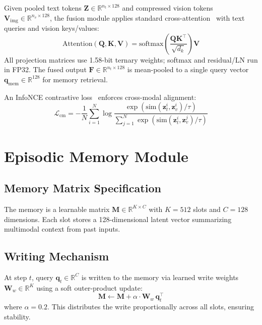 Given pooled text tokens $\mathbf{Z} \in \mathbb{R}^{n_t \times 128}$ and compressed vision tokens $\mathbf{V}_{\text{img}} \in \mathbb{R}^{n_v \times 128}$, the fusion module applies standard cross-attention~\cite{vaswani2017attention} with text queries and vision keys/values:
\begin{equation}
    \mathrm{Attention}(\mathbf{Q}, \mathbf{K}, \mathbf{V}) = \mathrm{softmax}\!\left(\frac{\mathbf{Q}\mathbf{K}^\top}{\sqrt{d_k}}\right)\mathbf{V}
\end{equation}
All projection matrices use 1.58-bit ternary weights; softmax and residual/LN run in FP32. The fused output $\mathbf{F} \in \mathbb{R}^{n_t \times 128}$ is mean-pooled to a single query vector $\mathbf{q}_{\text{mem}} \in \mathbb{R}^{128}$ for memory retrieval.

An InfoNCE contrastive loss~\cite{oord2018representation} enforces cross-modal alignment:
\begin{equation}
    \mathcal{L}_{\text{cm}} = -\frac{1}{N}\sum_{i=1}^{N} \log \frac{\exp(\mathrm{sim}(\mathbf{z}_t^i, \mathbf{z}_v^i)/\tau)}{\sum_{j=1}^{N} \exp(\mathrm{sim}(\mathbf{z}_t^i, \mathbf{z}_v^j)/\tau)}
\end{equation}

\section{Episodic Memory Module}
\label{sec:bitmar_memory}

\subsection{Memory Matrix Specification}
The memory is a learnable matrix $\mathbf{M} \in \mathbb{R}^{K \times C}$ with $K{=}512$ slots and $C{=}128$ dimensions. Each slot stores a 128-dimensional latent vector summarizing multimodal context from past inputs.

\subsection{Writing Mechanism}
At step $t$, query $\mathbf{q}_t \in \mathbb{R}^{C}$ is written to the memory via learned write weights $\mathbf{W}_w \in \mathbb{R}^{K}$ using a soft outer-product update:
\begin{equation}
    \mathbf{M} \leftarrow \mathbf{M} + \alpha \cdot \mathbf{W}_w \, \mathbf{q}_t^\top
    \label{eq:bitmar_mem_write}
\end{equation}
where $\alpha{=}0.2$. This distributes the write proportionally across all slots, ensuring stability.

